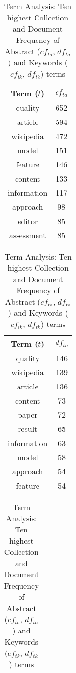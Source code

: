\begin{table}[ht]
    \caption{Term Analysis: Ten highest Collection and Document Frequency of Abstract ($cf_{ta}$, $df_{ta}$) and Keywords ($cf_{tk}$, $df_{tk}$) terms}
    \label{tab:terms}
    \begin{minipage}{.2\textwidth}
        \centering
        \begin{tabular}{c c}
            \toprule
            Term ($t$) & $cf_{ta}$ \\
            \midrule
            quality & 652 \\
            article & 594 \\
            wikipedia & 472 \\
            model & 151 \\
            feature & 146 \\
            content & 133 \\
            information & 117 \\
            approach & 98 \\
            editor & 85 \\
            assessment & 85 \\
            \bottomrule
        \end{tabular}
    \end{minipage}
    \begin{minipage}{.2\textwidth}
        \centering
        \begin{tabular}{c c}
            \toprule
            Term ($t$) & $df_{ta}$ \\
            \midrule
            quality & 146 \\
            wikipedia & 139 \\
            article & 136 \\
            content & 73 \\
            paper & 72 \\
            result & 65 \\
            information & 63 \\
            model & 58 \\
            approach & 54 \\
            feature & 54 \\
            \bottomrule
        \end{tabular}
    \end{minipage}
    \begin{minipage}{.2\textwidth}
        \centering
        \begin{tabular}{c c}

\end{tabular}
\end{minipage}
\end{table}

